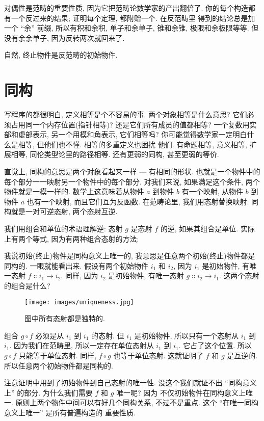 对偶性是范畴的重要性质, 因为它把范畴论数学家的产出翻倍了. 你的每个构造都有一个反过来的结果; 证明每个定理, 都附赠一个. 在反范畴里
得到的结论总是加一个 ``余'' 前缀, 所以有积和余积, 单子和余单子, 锥和余锥, 极限和余极限等等. 但没有余余单子, 因为反转两次就回来了.

自然, 终止物件是反范畴的初始物件.

\section{同构}

写程序的都很明白, 定义相等是个不容易的事. 两个对象相等是什么意思? 它们必须占用同一个内存位置(指针相等)? 还是它们所有成员的值都相等?
一个复数用实部和虚部表示, 另一个用模和角表示, 它们相等吗? 你可能觉得数学家一定明白什么是相等, 但他们也不懂. 相等的多重定义也困扰
他们. 有命题相等, 意义相等, 扩展相等, 同伦类型论里的路径相等. 还有更弱的同构, 甚至更弱的等价.

直觉上, 同构的意思是两个对象看起来一样 --- 有相同的形状. 也就是一个物件中的每个部分一一映射另一个物件中的每个部分.
对我们来说, 如果满足这个条件, 两个物件就是一模一样的. 数学上这意味着从物件 $a$ 到物件 $b$ 有一个映射, 从物件 $b$ 到物件 $a$
也有一个映射, 而且它们互为反函数. 在范畴论里, 我们用态射替换映射. 同构就是一对可逆态射, 两个态射互逆.

我们用组合和单位的术语理解逆: 态射 $g$ 是态射 $f$ 的逆, 如果其组合是单位. 实际上有两个等式, 因为有两种组合态射的方法:

我说初始(终止)物件是同构意义上唯一的, 我意思是任意两个初始(终止)物件都是同构的. 一眼就能看出来. 假设有两个初始物件 $i_{1}$ 和
$i_{2}$, 因为 $i_{1}$ 是初始物件, 有唯一态射 $f \Colon i_{1} \to i_{2}$. 同样, 因为 $i_{2}$ 是初始物件, 有唯一态射
$g \Colon i_{2} \to i_{1}$. 这两个态射的组合是什么?

\begin{figure}[H]
  \centering
  \texttt{[image: images/uniqueness.jpg]}
  \caption{图中所有态射都是独特的.}
\end{figure}

\noindent
组合 $g \circ f$ 必须是从 $i_{1}$ 到 $i_{1}$ 的态射. 但 $i_{1}$ 是初始物件, 所以只有一个态射从 $i_{1}$ 到 $i_{1}$.
因为我们在范畴里, 所以一定存在单位态射从 $i_{1}$ 到 $i_{1}$. 它占了这个位置. 所以 $g \circ f$ 只能等于单位态射. 同样,
$f \circ g$ 也等于单位态射. 这就证明了 $f$ 和 $g$ 是互逆的. 所以任意两个初始物件都是同构的.

注意证明中用到了初始物件到自己态射的唯一性. 没这个我们就证不出 ``同构意义上'' 的部分. 为什么我们需要 $f$ 和 $g$ 唯一呢? 因为
不仅初始物件在同构意义上唯一. 原则上两个物件中间可以有好几个同构关系, 不过不是重点. 这个 ``在唯一同构意义上唯一'' 是所有普遍构造的
重要性质.


